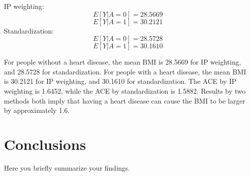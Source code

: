 \documentclass[letterpaper,12pt]{article}
\begin{document}
IP weighting:
	$$E[Y|A=0]=28.5669$$
	$$E[Y|A=1]=30.2121$$
Standardization:
	$$E[Y|A=0]=28.5728$$
	$$E[Y|A=1]=30.1610$$

For people without a heart disease, the mean BMI is 28.5669 for IP weighting, and 28.5728 for standardization.
For people with a heart disease, the mean BMI is 30.2121 for IP weighting, and 30.1610 for standardization.
The ACE by IP weighting is 1.6452, while the ACE by standardization is 1.5882. Results by two methods both imply that having a heart disease can cause the BMI to be larger by approximately 1.6.


\section{Conclusions}
Here you briefly summarize your findings.






\newpage
\end{document}
